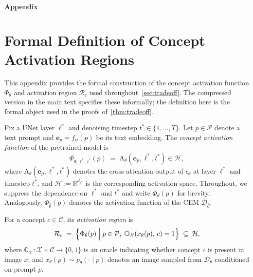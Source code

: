 \appendix
{\large \begin{center} {\bf Appendix} \end{center}}

\section{Formal Definition of Concept Activation Regions}
\label{app:concept_regions}
This appendix provides the formal construction of the concept activation function $\Phi_\theta$ and activation region $\mathcal{R}_c$ used throughout~\cref{sec:tradeoff}. The compressed version in the main text specifies these informally; the definition here is the formal object used in the proofs of~\cref{thm:tradeoff}.

\begin{definition}
\label{def:activation}
Fix a UNet layer $\ell^*$ and denoising timestep $t^* \in \{1,\ldots,T\}$. Let $p \in \mathcal{P}$ denote a text prompt and $\mathbf{e}_p = f_\psi(p)$ be its text embedding. The \emph{concept activation function} of the pretrained model is
\begin{equation}
    \Phi_{\theta, \ell^*,t^*}(p) \;=\; \mathrm{A}_{\theta}(\mathbf{e}_p,\ell^*,t^*) \in \mathcal{H},
\end{equation}
where $\mathrm{A}_{\theta}(\mathbf{e}_p, \ell^*, t^*)$ denotes the cross-attention output 
of $\epsilon_\theta$ at layer $\ell^*$ and timestep $t^*$, and $\mathcal{H} := \mathbb{R}^{d_{\ell^*}}$ is the corresponding activation space. 
Throughout, we suppress the dependence on $\ell^*$ 
and $t^*$ and write $\Phi_\theta(p)$ for brevity.
Analogously, $\Phi_{\hat{\theta}}(p)$ denotes the activation function of the CEM $\mathcal{D}_{\hat\theta}$.

For a concept $c \in \mathcal{C}$, its \emph{activation region} is
\begin{equation}
    \mathcal{R}_c
    \;=\;
    \Bigl\{
        \Phi_{\theta}(p)
        \;\Big|\;
        p \in \mathcal{P},\;
        \mathbb{O}_{\mathcal{X}}\!\left(x_{\theta}(p),\, c\right) = 1
    \Bigr\}
    \;\subseteq\; \mathcal{H},
\end{equation}
where $\mathbb{O}_{\mathcal{X}} : \mathcal{X} \times \mathcal{C} \to \{0,1\}$ is an oracle indicating whether concept $c$ is present in image $x$, and $x_{\theta}(p) \sim p_{\theta}(\cdot \mid p)$ denotes an image sampled from $\mathcal{D}_\theta$ conditioned on prompt $p$.
\end{definition}

